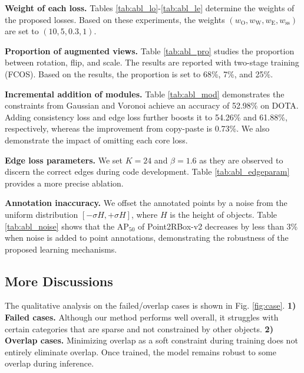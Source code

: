 \textbf{Weight of each loss.} Tables \ref{tab:abl_lo}-\ref{tab:abl_le} determine the weights of the proposed losses. Based on these experiments, the weights $(w_\text{O},w_\text{W},w_\text{E},w_\text{ss})$ are set to $(10, 5, 0.3, 1)$.

\textbf{Proportion of augmented views.} Table \ref{tab:abl_pro} studies the proportion between rotation, flip, and scale. The results are reported with two-stage training (FCOS). Based on the results, the proportion is set to 68\%, 7\%, and 25\%.

\textbf{Incremental addition of modules.} Table \ref{tab:abl_mod} demonstrates the constraints from Gaussian and Voronoi achieve an accuracy of 52.98\% on DOTA. Adding consistency loss and edge loss further boosts it to 54.26\% and 61.88\%, respectively, whereas the improvement from copy-paste is 0.73\%. We also demonstrate the impact of omitting each core loss.

\textbf{Edge loss parameters.} We set $K=24$ and $\beta=1.6$ as they are observed to discern the correct edges during code development. Table \ref{tab:abl_edgeparam} provides a more precise ablation.

\textbf{Annotation inaccuracy.} We offset the annotated points by a noise from the uniform distribution $\left[-\sigma H, +\sigma H \right ]$, where $H$ is the height of objects. Table \ref{tab:abl_noise} shows that the AP$_{50}$ of Point2RBox-v2 decreases by less than 3\% when noise is added to point annotations, demonstrating the robustness of the proposed learning mechanisms.

\subsection{More Discussions}
\label{sec:experiment-discussions}

The qualitative analysis on the failed/overlap cases is shown in Fig. \ref{fig:case}. \textbf{1) Failed cases.} Although our method performs well overall, it struggles with certain categories that are sparse and not constrained by other objects. \textbf{2) Overlap cases.} 
Minimizing overlap as a soft constraint during training does not entirely eliminate overlap. Once trained, the model remains robust to some overlap during inference.
